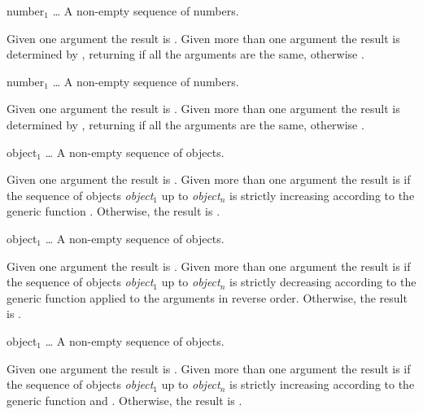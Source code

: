 \begin{optDefinition}
\function{=}
%
\begin{arguments}
    \item[{number$_1$ \ldots}] A non-empty sequence of numbers.
\end{arguments}
%
\result%
Given one argument the result is \true{}.  Given more than one argument the
result is determined by , returning \true{} if all the
arguments are the same, otherwise \nil{}.

\function{!=}
%
\begin{arguments}
    \item[{number$_1$ \ldots}] A non-empty sequence of numbers.
\end{arguments}
%
\result%
Given one argument the result is \nil{}.  Given more than one argument the
result is determined by , returning \nil{} if all the
arguments are the same, otherwise \true{}.

\function{<}
%
\begin{arguments}
    \item[object$_1$ \ldots] A non-empty sequence of objects.
\end{arguments}
%
\result%
Given one argument the result is \true{}.  Given more than one argument the
result is \true{} if the sequence of objects {\em object$_1$} up to {\em
    object$_n$} is strictly increasing according to the generic function
.  Otherwise, the result is \nil{}.

\function{>}
%
\begin{arguments}
    \item[object$_1$ \ldots] A non-empty sequence of objects.
\end{arguments}
%
\result%
Given one argument the result is \true{}.  Given more than one argument the
result is \true{} if the sequence of objects {\em object$_1$} up to {\em
    object$_n$} is strictly decreasing according to the generic function
 applied to the arguments in reverse order.  Otherwise, the
result is \nil{}.

\function{<=}
%
\begin{arguments}
    \item[object$_1$ \ldots] A non-empty sequence of objects.
\end{arguments}
%
\result%
Given one argument the result is \true{}.  Given more than one argument the
result is \true{} if the sequence of objects {\em object$_1$} up to {\em
    object$_n$} is strictly increasing according to the generic function
 and .  Otherwise, the result is \nil{}.


\end{optDefinition}
